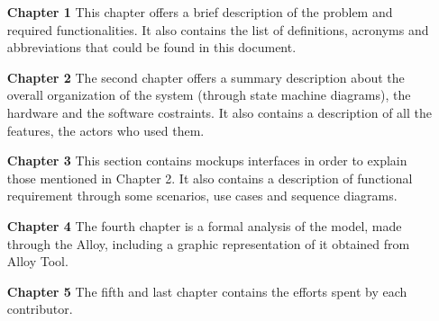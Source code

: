 \begin{enumerate}
    \item[\textbf{Chapter 1}] This chapter offers a brief description of the problem and required functionalities. It also
    contains the list of definitions, acronyms and abbreviations that could be found in this document. 

    \item[\textbf{Chapter 2}] The second chapter offers a summary description about the overall organization of the system 
    (through state machine diagrams), the hardware and the software costraints. 
    It also contains a description of all the features, the actors who used them.

    \item[\textbf{Chapter 3}] This section contains mockups interfaces in order to explain those mentioned in Chapter 2.
    It also contains a description of functional requirement through some scenarios, use cases and sequence diagrams. 

    \item[\textbf{Chapter 4}] The fourth chapter is a formal analysis of the model, made through the Alloy, including a graphic representation of it obtained from Alloy Tool.

    \item[\textbf{Chapter 5}] The fifth and last chapter contains the efforts spent by each contributor.
\end{enumerate}
